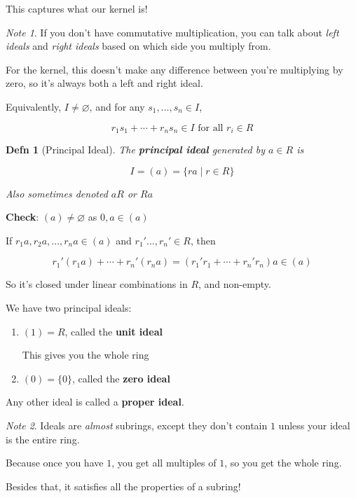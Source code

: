 \documentclass[12pt]{article}
\newtheorem{definition}{Defn}
\theoremstyle{remark}
\theoremstyle{remark}
\theoremstyle{remark}
\theoremstyle{remark}
\theoremstyle{remark}
\newtheorem*{note}{Note}
\begin{document}
This captures what our kernel is!

\begin{note}
  If you don't have commutative multiplication, you can talk about {\it left
  ideals} and {\it right ideals} based on which side you multiply from.

  For the kernel, this doesn't make any difference between you're multiplying by
  zero, so it's always both a left and right ideal.
\end{note}

Equivalently, $I \ne \varnothing$, and for any $s_1, \dots, s_n \in I$, 

\[
  r_1 s_1 + \cdots + r_n s_n \in I \text{ for all $r_i \in R$}
\]

\begin{definition}[Principal Ideal]
  The {\bf principal ideal} generated by $a \in R$ is 

  \[
    I = (a) = \{ra \mid r \in R\}
  \]

  Also sometimes denoted $aR$ or $Ra$
\end{definition}

{\bf Check}: $(a) \ne \varnothing$ as $0, a \in (a)$

If $r_1 a, r_2 a, \dots, r_n a \in (a)$ and $r_1' \dots, r_n' \in R$, then 

\[
  r_1' (r_1 a) + \cdots + r_n' (r_n a) = (r_1' r_1 + \cdots + r_n' r_n)a \in (a)
\]

So it's closed under linear combinations in $R$, and non-empty.

We have two principal ideals:

\begin{enumerate}
  \item $(1) = R$, called the {\bf unit ideal}

    This gives you the whole ring

  \item $(0) = \{0\}$, called the {\bf zero ideal}
\end{enumerate}

Any other ideal is called a {\bf proper ideal}.

\begin{note}
  Ideals are {\it almost} subrings, except they don't contain $1$ unless your
  ideal is the entire ring.

  Because once you have $1$, you get all multiples of $1$, so you get the whole
  ring.

  Besides that, it satisfies all the properties of a subring!
\end{note}
\end{document}
